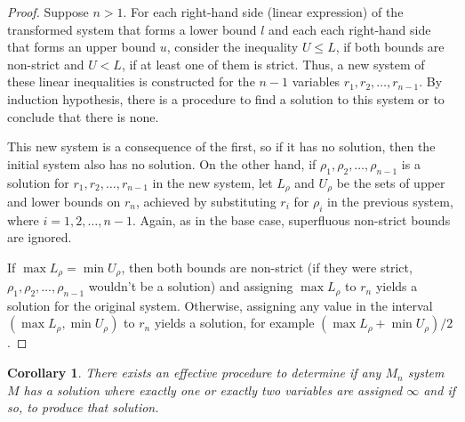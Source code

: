\documentclass{article}
\newtheorem*{corollary}{Corollary}
\begin{document}
\begin{proof}
  Suppose $n > 1$. For each right-hand side (linear expression) of the transformed system that forms a lower bound $l$ and each each right-hand side that forms an upper bound $u$, consider the inequality $U \leq L$, if both bounds are non-strict and $U < L$, if at least one of them is strict. Thus, a new system of these linear inequalities is constructed for the $n-1$ variables $r_1, r_2, \dots, r_{n-1}$. By induction hypothesis, there is a procedure to find a solution to this system or to conclude that there is none.

  This new system is a consequence of the first, so if it has no solution, then the initial system also has no solution. On the other hand, if $\rho_1, \rho_2, \dots, \rho_{n-1}$ is a solution for $r_1, r_2, \dots, r_{n-1}$ in the new system, let $L_\rho$ and $U_\rho$ be the sets of upper and lower bounds on $r_n$, achieved by substituting $r_i$ for $\rho_i$ in the previous system, where $i = 1, 2, \dots, n-1$. Again, as in the base case, superfluous non-strict bounds are ignored.

  If $\max L_\rho = \min U_\rho$, then both bounds are non-strict (if they were strict, $\rho_1, \rho_2, \dots, \rho_{n-1}$ wouldn't be a solution) and assigning $\max L_\rho$ to $r_n$ yields a solution for the original system. Otherwise, assigning any value in the interval $(\max L_\rho, \min U_\rho)$ to $r_n$ yields a solution, for example $(\max L_\rho + \min U_\rho)/2$.
\end{proof}
\begin{corollary}
  There exists an effective procedure to determine if any $M_n$ system $M$ has a solution where exactly one or exactly two variables are assigned $\infty$ and if so, to produce that solution.
\end{corollary}
\end{document}
